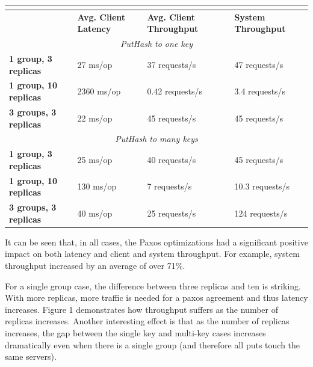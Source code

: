 \documentclass[letterpaper,10pt]{article}
\begin{document}
\begin{table}
\begin{tabular}{|l|l|l|l|}
\hline
\multicolumn{4}{|c|}{\cellcolor[HTML]{C0C0C0}{\color[HTML]{000000} \textbf{Multipaxos}}}                              \\ \hline
                              & \textbf{Avg. Client Latency} & \textbf{Avg. Client Throughput} & \textbf{System Throughput} \\ \hline
\multicolumn{4}{|c|}{\textit{PutHash to one key}}                                                                     \\ \hline
\textbf{1 group, 3 replicas}  & 27 ms/op                     & 37 requests/s                & 47 requests/s           \\ \hline
\textbf{1 group, 10 replicas} & 2360 ms/op                   & 0.42 requests/s              & 3.4 requests/s          \\ \hline
\textbf{3 groups, 3 replicas} & 22 ms/op                     & 45 requests/s                & 45 requests/s           \\ \hline
\multicolumn{4}{|c|}{\textit{PutHash to many keys}}                                                                   \\ \hline
\textbf{1 group, 3 replicas}  & 25 ms/op                     & 40 requests/s                & 45 requests/s           \\ \hline
\textbf{1 group, 10 replicas} & 130 ms/op                    & 7 requests/s                 & 10.3 requests/s         \\ \hline
\textbf{3 groups, 3 replicas} & 40 ms/op                     & 25 requests/s                & 124 requests/s          \\ \hline
\end{tabular}
\end{table}

It can be seen that, in all cases, the Paxos optimizations had a significant positive impact on both latency and client and system throughput.  For example, system throughput increased by an average of over 71\%.

For a single group case, the difference between three replicas and ten is striking.  With more replicas, more traffic is needed for a paxos agreement and thus latency increases.  Figure 1 demonstrates how throughput suffers as the number of replicas increases.  Another interesting effect is that as the number of replicas increases, the gap between the single key and multi-key cases increases dramatically even when there is a single group (and therefore all puts touch the same servers).
\end{document}
